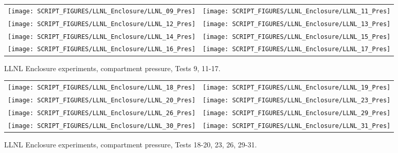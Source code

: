 \begin{figure}[p]
\begin{tabular*}{\textwidth}{l@{\extracolsep{\fill}}r}
\texttt{[image: SCRIPT\_FIGURES/LLNL\_Enclosure/LLNL\_09\_Pres]} &
\texttt{[image: SCRIPT\_FIGURES/LLNL\_Enclosure/LLNL\_11\_Pres]} \\
\texttt{[image: SCRIPT\_FIGURES/LLNL\_Enclosure/LLNL\_12\_Pres]} &
\texttt{[image: SCRIPT\_FIGURES/LLNL\_Enclosure/LLNL\_13\_Pres]} \\
\texttt{[image: SCRIPT\_FIGURES/LLNL\_Enclosure/LLNL\_14\_Pres]} &
\texttt{[image: SCRIPT\_FIGURES/LLNL\_Enclosure/LLNL\_15\_Pres]} \\
\texttt{[image: SCRIPT\_FIGURES/LLNL\_Enclosure/LLNL\_16\_Pres]} &
\texttt{[image: SCRIPT\_FIGURES/LLNL\_Enclosure/LLNL\_17\_Pres]}
\end{tabular*}
\caption{LLNL Enclosure experiments, compartment pressure, Tests 9, 11-17.}
\label{LLNL_Enclosure_Pres_2}
\end{figure}

\begin{figure}[p]
\begin{tabular*}{\textwidth}{l@{\extracolsep{\fill}}r}
\texttt{[image: SCRIPT\_FIGURES/LLNL\_Enclosure/LLNL\_18\_Pres]} &
\texttt{[image: SCRIPT\_FIGURES/LLNL\_Enclosure/LLNL\_19\_Pres]} \\
\texttt{[image: SCRIPT\_FIGURES/LLNL\_Enclosure/LLNL\_20\_Pres]} &
\texttt{[image: SCRIPT\_FIGURES/LLNL\_Enclosure/LLNL\_23\_Pres]} \\
\texttt{[image: SCRIPT\_FIGURES/LLNL\_Enclosure/LLNL\_26\_Pres]} &
\texttt{[image: SCRIPT\_FIGURES/LLNL\_Enclosure/LLNL\_29\_Pres]} \\
\texttt{[image: SCRIPT\_FIGURES/LLNL\_Enclosure/LLNL\_30\_Pres]} &
\texttt{[image: SCRIPT\_FIGURES/LLNL\_Enclosure/LLNL\_31\_Pres]}
\end{tabular*}
\caption{LLNL Enclosure experiments, compartment pressure, Tests 18-20, 23, 26, 29-31.}
\label{LLNL_Enclosure_Pres_3}
\end{figure}

